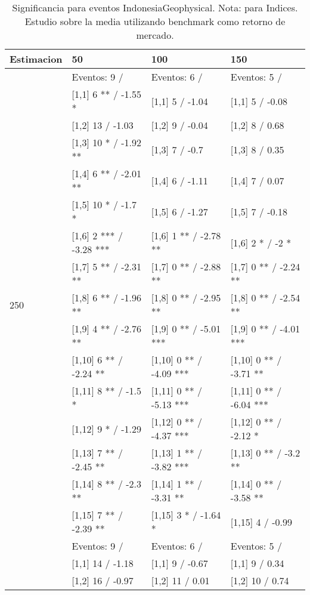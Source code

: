 \begin{table}

\caption{Significancia para eventos IndonesiaGeophysical. Nota: para Indices. Estudio sobre la media utilizando benchmark como retorno de mercado.}
\centering
\begin{tabular}[t]{llll}
\toprule
Estimacion & 50 & 100 & 150\\
\midrule
 & Eventos:  9 / & Eventos:  6 / & Eventos:  5 /\\
 & {}[1,1] 6 ** / -1.55 * & {}[1,1] 5  / -1.04 & {}[1,1] 5  / -0.08\\
 & {}[1,2] 13  / -1.03 & {}[1,2] 9  / -0.04 & {}[1,2] 8  / 0.68\\
 & {}[1,3] 10 * / -1.92 ** & {}[1,3] 7  / -0.7 & {}[1,3] 8  / 0.35\\
 & {}[1,4] 6 ** / -2.01 ** & {}[1,4] 6  / -1.11 & {}[1,4] 7  / 0.07\\
\addlinespace
 & {}[1,5] 10 * / -1.7 * & {}[1,5] 6  / -1.27 & {}[1,5] 7  / -0.18\\
 & {}[1,6] 2 *** / -3.28 *** & {}[1,6] 1 ** / -2.78 ** & {}[1,6] 2 * / -2 *\\
 & {}[1,7] 5 ** / -2.31 ** & {}[1,7] 0 ** / -2.88 ** & {}[1,7] 0 ** / -2.24 **\\
250 & {}[1,8] 6 ** / -1.96 ** & {}[1,8] 0 ** / -2.95 ** & {}[1,8] 0 ** / -2.54 **\\
 & {}[1,9] 4 ** / -2.76 ** & {}[1,9] 0 ** / -5.01 *** & {}[1,9] 0 ** / -4.01 ***\\
\addlinespace
 & {}[1,10] 6 ** / -2.24 ** & {}[1,10] 0 ** / -4.09 *** & {}[1,10] 0 ** / -3.71 **\\
 & {}[1,11] 8 ** / -1.5 * & {}[1,11] 0 ** / -5.13 *** & {}[1,11] 0 ** / -6.04 ***\\
 & {}[1,12] 9 * / -1.29 & {}[1,12] 0 ** / -4.37 *** & {}[1,12] 0 ** / -2.12 *\\
 & {}[1,13] 7 ** / -2.45 ** & {}[1,13] 1 ** / -3.82 *** & {}[1,13] 0 ** / -3.2 **\\
 & {}[1,14] 8 ** / -2.3 ** & {}[1,14] 1 ** / -3.31 ** & {}[1,14] 0 ** / -3.58 **\\
\addlinespace
 & {}[1,15] 7 ** / -2.39 ** & {}[1,15] 3 * / -1.64 * & {}[1,15] 4  / -0.99\\
 & Eventos:  9 / & Eventos:  6 / & Eventos:  5 /\\
 & {}[1,1] 14  / -1.18 & {}[1,1] 9  / -0.67 & {}[1,1] 9  / 0.34\\
 & {}[1,2] 16  / -0.97 & {}[1,2] 11  / 0.01 & {}[1,2] 10  / 0.74\\

\end{tabular}
\end{table}

